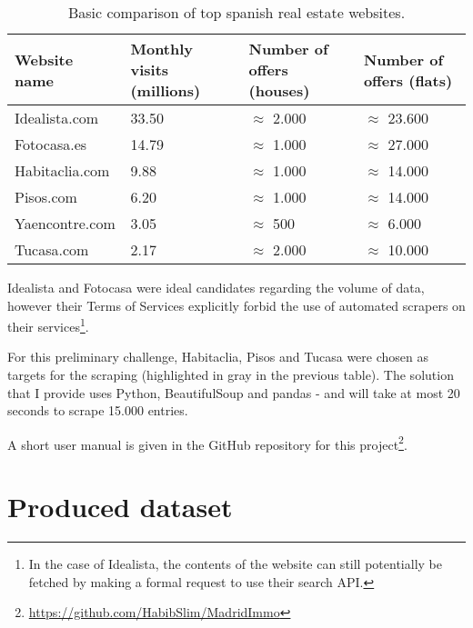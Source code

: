 \documentclass{article}
\newcommand{\ezskip}{\medskip\noindent}
\begin{document}
\begin{normalsize}
    	\begin{table}[h!]
          \begin{center}
            \label{tab:table1}
            \begin{tabular}{l|l|l|l}
                \textbf{Website name} & \textbf{Monthly visits (millions)} & \textbf{Number of offers (houses)} & \textbf{Number of offers (flats)}\\ %
                \hline
                     Idealista.com  & 33.50 & $\approx$ 2.000  & $\approx$ 23.600 \\ %
                     Fotocasa.es    & 14.79 & $\approx$ 1.000  & $\approx$ 27.000 \\ %
\rowcolor[gray]{0.9} Habitaclia.com & 9.88  & $\approx$ 1.000  & $\approx$ 14.000 \\ %
\rowcolor[gray]{0.9} Pisos.com      & 6.20  & $\approx$ 1.000  & $\approx$ 14.000 \\ %
                     Yaencontre.com & 3.05  & $\approx$ 500    & $\approx$  6.000 \\ %
\rowcolor[gray]{0.9} Tucasa.com     & 2.17  & $\approx$ 2.000  & $\approx$ 10.000 \\ %
            \end{tabular}
            \caption{Basic comparison of top spanish real estate websites.}
          \end{center}
        \end{table}
        
        \ezskip Idealista and Fotocasa were ideal candidates regarding the volume of data, however their Terms of Services explicitly forbid the use of automated scrapers on their services\footnote{In the case of Idealista, the contents of the website can still potentially be fetched by making a formal request to use their search API.}.
        
        \ezskip For this preliminary challenge, Habitaclia, Pisos and Tucasa were chosen as targets for the scraping (highlighted in gray in the previous table). The solution that I provide uses Python, BeautifulSoup and pandas - and will take at most 20 seconds to scrape 15.000 entries.

        \ezskip A short user manual is given in the GitHub repository for this project\footnote{\url{https://github.com/HabibSlim/MadridImmo}}.

        \newpage
		\section{Produced dataset}

\end{normalsize}
\end{document}
